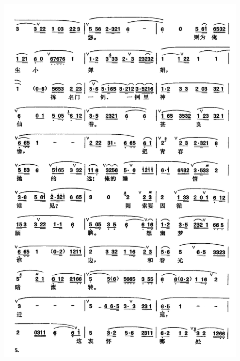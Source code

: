 \documentclass[cn,pad,twocol]{elegantbook}
\begin{document}
\paragraph*{\includegraphics[width=0.95\textwidth]{mudanting/2020-牡丹亭-游园惊梦5}}
\end{document}
